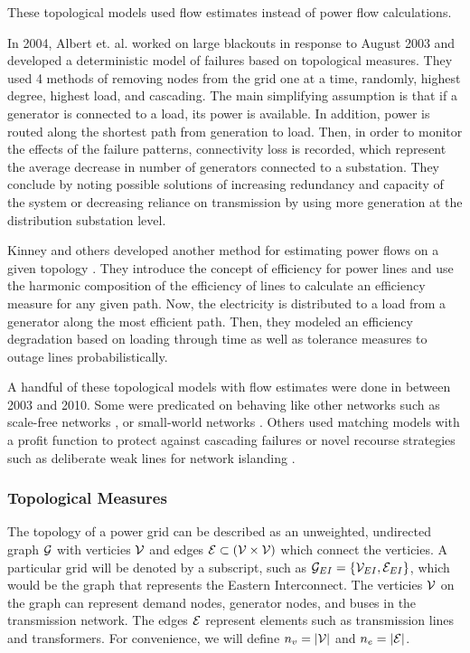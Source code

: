 These topological models used flow estimates instead of power flow calculations.

In 2004, Albert et. al. \cite{albert_2004} worked on large blackouts in response to August 2003 and developed a deterministic model of failures based on topological measures.  They used 4 methods of removing nodes from the grid one at a time, randomly, highest degree, highest load, and cascading.  The main simplifying assumption is that if a generator is connected to a load, its power is available.  In addition, power is routed along the shortest path from generation to load.  Then, in order to monitor the effects of the failure patterns, connectivity loss is recorded, which represent the average decrease in number of generators connected to a substation.  They conclude by noting possible solutions of increasing redundancy and capacity of the system or decreasing reliance on transmission by using more generation at the distribution substation level.

Kinney and others developed another method for estimating power flows on a given topology \cite{kinney_2005}.  They introduce the concept of efficiency for power lines and use the harmonic composition of the efficiency of lines to calculate an efficiency measure for any given path.  Now, the electricity is distributed to a load from a generator along the most efficient path.  Then, they modeled an efficiency degradation based on loading through time as well as tolerance measures to outage lines probabilistically.

A handful of these topological models with flow estimates were done in between 2003 and 2010.  Some were predicated on behaving like other networks such as scale-free networks \cite{zhao_2004}, \cite{wang_2009} or small-world networks \cite{ding_2006}.  Others used matching models with a profit function to protect against cascading failures \cite{sun_2008} or novel recourse strategies such as deliberate weak lines for network islanding \cite{duenas-osorio_2009}. 

\subsubsection{Topological Measures}

The topology of a power grid can be described as an unweighted, undirected graph $\mathcal{G}$ with verticies $\mathcal{V}$ and edges $\mathcal{E} \subset (\mathcal{V} \times \mathcal{V})$ which connect the verticies.  A particular grid will be denoted by a subscript, such as $\mathcal{G}_{EI} = \left\{ \mathcal{V}_{EI}, \mathcal{E}_{EI} \right\}$, which would be the graph that represents the Eastern Interconnect.  The verticies $\mathcal{V}$ on the graph can represent demand nodes, generator nodes, and buses in the transmission network.  The edges $\mathcal{E}$ represent elements such as transmission lines and transformers.  For convenience, we will define $n_v = \left| \mathcal{V} \right|$ and $n_e = \left| \mathcal{E} \right|$.

